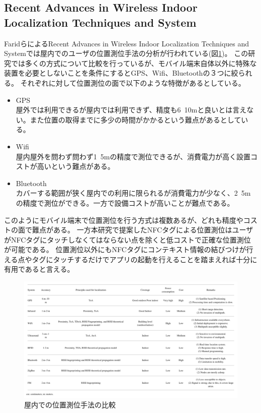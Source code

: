 \subsection{Recent Advances in Wireless Indoor Localization Techniques and System}
FaridらによるRecent Advances in Wireless Indoor Localization Techniques and System\cite{Farid2013}では屋内でのユーザの位置測位手法の分析が行われている(図\ref{fig:IndoorLocalization})。
この研究では多くの方式について比較を行っているが、モバイル端末自体以外に特殊な装置を必要としないことを条件にするとGPS、Wifi、Bluetoothの３つに絞られる。
それぞれに対して位置測位の面で以下のような特徴があるとしている。
\begin{itemize} 
  \item GPS\\
    屋外では利用できるが屋内では利用できず、精度も6~10mと良いとは言えない。また位置の取得までに多少の時間がかかるという難点があるとしている。
  \item Wifi\\
    屋内屋外を問わず問わず1~5mの精度で測位できるが、消費電力が高く設置コストが高いという難点がある。
  \item Bluetooth\\
    カバーする範囲が狭く屋内での利用に限られるが消費電力が少なく、2~5mの精度で測位ができる。一方で設備コストが高いことが難点である。
\end{itemize}
このようにモバイル端末で位置測位を行う方式は複数あるが、どれも精度やコストの面で難点がある。
一方本研究で提案したNFCタグによる位置測位はユーザがNFCタグにタッチしなくてはならない点を除くと低コストで正確な位置測位が可能である。
位置測位以外にもNFCタグにコンテキスト情報の結びつけが行える点やタグにタッチするだけでアプリの起動を行えることを踏まえれば十分に有用であると言える。

\begin{figure}[h]
  \centering 
  \includegraphics[width=120mm]{images/IndoorLocalization.png}
  \caption{屋内での位置測位手法の比較} \label{fig:IndoorLocalization}
\end{figure}


